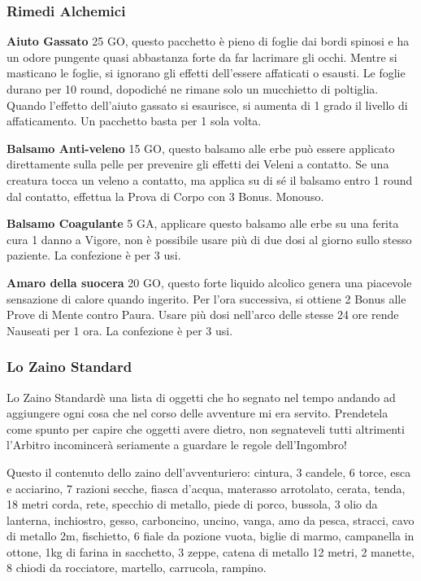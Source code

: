 \documentclass[12pt,a4paper,twoside,openany]{book}
\begin{document}
\begin{multicols}{2}
\subsubsection{Rimedi Alchemici}

\label{rimedi-alchemici}

\textbf{Aiuto Gassato} 25 GO, questo pacchetto è pieno di foglie dai bordi spinosi e ha un odore pungente quasi abbastanza forte da far lacrimare gli occhi. Mentre si masticano le foglie, si ignorano gli effetti dell'essere affaticati o esausti. Le foglie durano per 10 round, dopodiché ne rimane solo un mucchietto di poltiglia.
Quando l'effetto dell'aiuto gassato si esaurisce, si aumenta di 1 grado il livello di affaticamento. Un pacchetto basta per 1 sola volta.

\textbf{Balsamo Anti-veleno} 15 GO, questo balsamo alle erbe può essere applicato direttamente sulla pelle per prevenire gli effetti dei Veleni a contatto. Se una creatura tocca un veleno a contatto, ma applica su di sé il balsamo entro 1 round dal contatto, effettua la Prova di Corpo con 3 Bonus. Monouso.

\textbf{Balsamo Coagulante} 5 GA, applicare questo balsamo alle erbe su una ferita cura 1 danno a Vigore, non è possibile usare più di due dosi al giorno sullo stesso paziente. La confezione è per 3 usi.

\textbf{Amaro della suocera} 20 GO, questo forte liquido alcolico genera una piacevole sensazione di calore quando ingerito. Per l'ora successiva, si ottiene 2 Bonus alle Prove di Mente contro Paura. Usare più dosi nell'arco delle stesse 24 ore rende Nauseati per 1 ora. La confezione è per 3 usi.


\subsubsection{Lo Zaino Standard\texorpdfstring{\huge{\textregistered}}{\textregistered}} 

Lo Zaino Standard\textregistered \space è una lista di oggetti che ho segnato nel tempo andando ad aggiungere ogni cosa che nel corso delle avventure mi era servito.
Prendetela come spunto per capire che oggetti avere dietro, non segnateveli tutti altrimenti l'Arbitro incomincerà seriamente a guardare le regole dell'Ingombro!

Questo il contenuto dello zaino dell'avventuriero: cintura, 3 candele, 6 torce, esca e acciarino, 7 razioni secche, fiasca d'acqua, materasso arrotolato, cerata, tenda, 18 metri corda, rete, specchio di metallo, piede di porco, bussola, 3 olio da lanterna, inchiostro, gesso, carboncino, uncino, vanga, amo da pesca, stracci, cavo di metallo 2m, fischietto, 6 fiale da pozione vuota, biglie di marmo, campanella in ottone, 1kg di farina in sacchetto, 3 zeppe, catena di metallo 12 metri, 2 manette, 8 chiodi da rocciatore, martello, carrucola, rampino.


\end{multicols}
\end{document}
